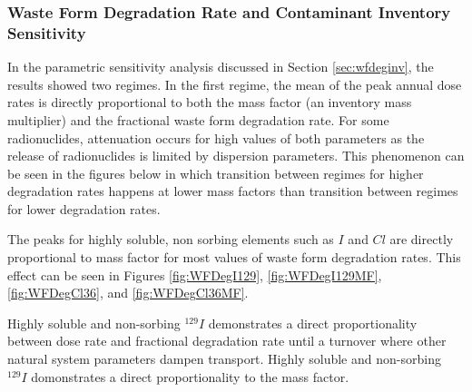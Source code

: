 \subsubsection{Waste Form Degradation Rate and Contaminant Inventory Sensitivity}

In the parametric sensitivity analysis discussed in Section 
\ref{sec:wfdeginv}, the results showed two regimes. In the first regime, the 
mean of the peak annual dose rates is directly proportional to both the mass 
factor (an inventory mass multiplier) and the fractional waste 
form degradation rate. For some radionuclides, attenuation occurs for high 
values of both parameters as the release of radionuclides is limited by 
dispersion parameters. This phenomenon can be seen in the figures below in which 
transition between regimes for higher degradation rates happens at lower mass 
factors than transition between regimes for lower degradation rates. 

The peaks for highly soluble, non sorbing elements such as $I$ and $Cl$
are directly proportional to mass factor for most 
values of waste form degradation rates. This effect can be seen in Figures 
\ref{fig:WFDegI129}, \ref{fig:WFDegI129MF}, \ref{fig:WFDegCl36}, and 
\ref{fig:WFDegCl36MF}. 


Highly soluble and non-sorbing $^{129}I$ demonstrates a direct proportionality between dose rate and 
fractional degradation rate until a turnover where other natural system 
parameters dampen transport. Highly soluble and non-sorbing $^{129}I$ domonstrates a direct 
proportionality to the mass factor.

